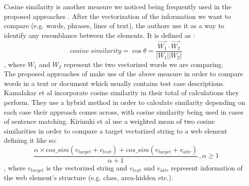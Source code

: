 Cosine similarity is another measure we noticed being frequently used in the proposed approaches \cite{kamalakar2013automatically, 9609160, chen2021test, 8812113}. After the vectorization of the information we 
want to compare (e.g. words, phrases, lines of text), the authors use it as a way to identify any resemblance between the elements. It is defined as \cite{salton1988term}: 
\[cosine\:similarity =\cos\theta=\frac{\overrightarrow {W_1} \cdot \overrightarrow {W_2}}{|W_1||W_2|} \]
, where \(W_1\) and \(W_2\) represent the two vectorized words we are comparing.\\
The proposed approaches of \cite{chen2021test, 8812113} make use of the above measure in order to compare words in a text or document which usually contains test case descriptions.
Kamalakar et al \cite{kamalakar2013automatically} incorporate cosine similarity in their total of calculations they perform. They use a hybrid method in order to calculate similarity depending on each case 
their approach comes across, with cosine similarity being used in cases of sentence matching. Kirinuki et al \cite{9609160} use a weighted mean of two cosine similarities in order to compare a target vectorized 
string to a web element defining it like so:
\[\frac{\alpha\times cos\_sim(v_{target} + v_{text})+ cos\_sim(v_{target}+v_{attr})}{\alpha+1}\,  ,  \alpha \geq 1\]
, where \(v_{target}\) is the vectorized string and \(v_{text}\) and \(v_{attr}\) represent information of the web element's structure (e.g. class, area-hidden etc.).\\

